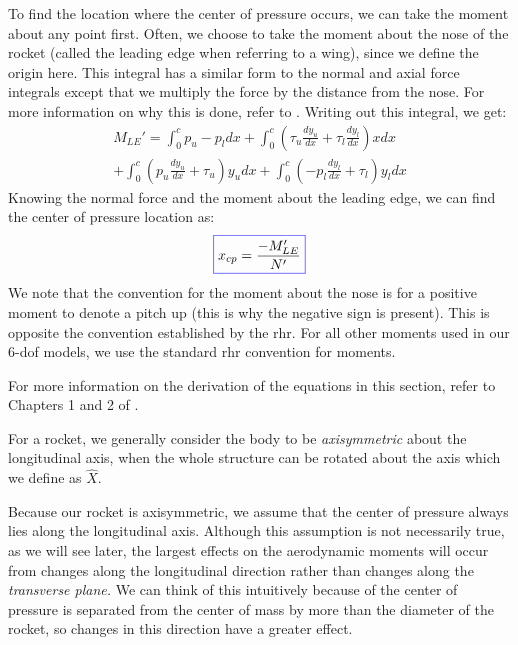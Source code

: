 \documentclass[12pt]{report}
\begin{document}
{To find the location where the center of pressure occurs, we can take the moment about any point first. Often, we choose to take the moment about the nose of the rocket (called the leading edge when referring to a wing), since we define the origin here. This integral has a similar form to the normal and axial force integrals except that we multiply the force by the distance from the nose. For more information on why this is done, refer to \cite{gundersen_understanding_2020}. Writing out this integral, we get:
\begin{gather}
    M_{LE}'=\int_0^c{p_u-p_l}{dx}+\int_0^c{\left(\tau_u\frac{dy_u}{dx}+\tau_l\frac{dy_l}{dx}\right)}{xdx}\\+\int_0^c{\left(p_u\frac{dy_u}{dx}+\tau_u\right)}{y_udx}+\int_0^c{\left(-p_l\frac{dy_l}{dx}+\tau_l\right)}{y_ldx}
\end{gather}
Knowing the normal force and the moment about the leading edge, we can find the center of pressure location as:
\begin{gather}
    \color{blue}\boxed{\color{black}x_{cp}=\frac{-M_{LE}'}{N'}}
\end{gather}
We note that the convention for the moment about the nose is for a positive moment to denote a pitch up (this is why the negative sign is present). This is opposite the convention established by the \gls{rhr}. For all other moments used in our 6-\gls{dof} models, we use the standard \gls{rhr} convention for moments.

For more information on the derivation of the equations in this section, refer to Chapters 1 and 2 of \cite{anderson_fundamentals_2017}.

For a rocket, we generally consider the body to be \textit{axisymmetric} about the longitudinal axis, when the whole structure can be rotated about the axis which we define as $\hat{X}$. 

Because our rocket is axisymmetric, we assume that the center of pressure always lies along the longitudinal axis. Although this assumption is not necessarily true, as we will see later, the largest effects on the aerodynamic moments will occur from changes along the longitudinal direction rather than changes along the \textit{transverse plane. }We can think of this intuitively because of the center of pressure is separated from the center of mass by more than the diameter of the rocket, so changes in this direction have a greater effect.
}
\end{document}
